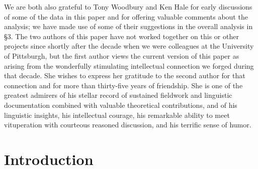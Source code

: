 \documentclass[output=paper,colorlinks,citecolor=brown]{langscibook}
\begin{document}
   We are both also grateful to Tony Woodbury and {\dag}Ken Hale for
   early discussions of some of the data in this paper and for
   offering valuable comments about the analysis; we have made use of
   some of their suggestions in the overall analysis in \S 3.  The
   two authors of this paper have not worked together on this or
   other projects since shortly after the decade when we were
   colleagues at the University of Pittsburgh, but the first author
   views the current version of this paper as arising from the
   wonderfully stimulating intellectual connection we forged during
   that decade.  She wishes to express her gratitude to the second
   author for that connection and for more than thirty-five years of
   friendship.  She is one of the greatest admirers of his stellar
   record of sustained fieldwork and linguistic documentation
   combined with valuable theoretical contributions, and of his
   linguistic insights, his intellectual courage, his remarkable
   ability to meet vituperation with courteous reasoned discussion,
   and his terrific sense of humor.

\section{Introduction}
\end{document}
